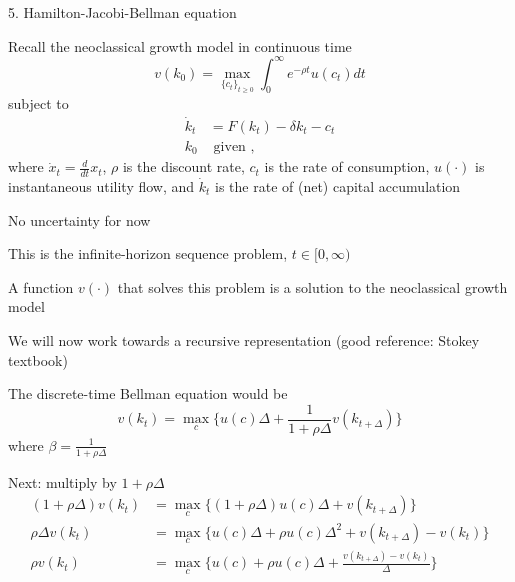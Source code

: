 \documentclass[11pt, aspectratio=169]{beamer}
\newenvironment{witemize}{\itemize\addtolength{\itemsep}{10pt}}{\enditemize}
\begin{document}
\begin{frame}{5. Hamilton-Jacobi-Bellman equation}
\begin{witemize}
\item Recall the neoclassical growth model in continuous time
\begin{equation*}
	v(k_0) = \max_{\{ c_t \}_{t \geq 0} } \int_0^\infty e^{-\rho t} u(c_t) dt
\end{equation*}
subject to
\begin{align*}
	\dot k_t &= F(k_t) - \delta k_t - c_t \\
	k_0 &\text{ given },
\end{align*}
where $\dot x_t = \frac{d}{dt} x_t$, $\rho$ is the discount rate, $c_t$ is the rate of consumption, $u(\cdot)$ is instantaneous utility flow, and $\dot k_t$ is the rate of (net) capital accumulation

\item No uncertainty for now %

\item This is the infinite-horizon sequence problem, $t \in [0, \infty)$

\item A function $v(\cdot)$ that solves this problem is a solution to the neoclassical growth model 
\end{witemize}
\end{frame}


\begin{frame}{}
\begin{witemize}
\item We will now work towards a recursive representation (good reference: Stokey textbook)

\item The discrete-time Bellman equation would be
\begin{equation*}
	v(k_t) = \max_c \Big\{ u(c) \Delta + \frac{1}{1 + \rho \Delta} v(k_{t+\Delta}) \Big\}
\end{equation*}
where $\beta = \frac{1}{1+ \rho \Delta}$

\item Next: multiply by $1 + \rho \Delta$ 
\begin{align*}
	(1 + \rho \Delta) v(k_t) &= \max_c \Big\{ (1 + \rho \Delta) u(c) \Delta + v(k_{t+\Delta}) \Big\} \\
	\rho \Delta v(k_t) &= \max_c \Big\{ u(c) \Delta + \rho u(c) \Delta^2 + v(k_{t+\Delta}) - v(k_t) \Big\} \\
	\rho v(k_t) &= \max_c \Big\{ u(c) + \rho u(c) \Delta + \frac{v(k_{t+\Delta}) - v(k_t)}{\Delta} \Big\}
\end{align*}
\end{witemize}
\end{frame}
\end{document}
